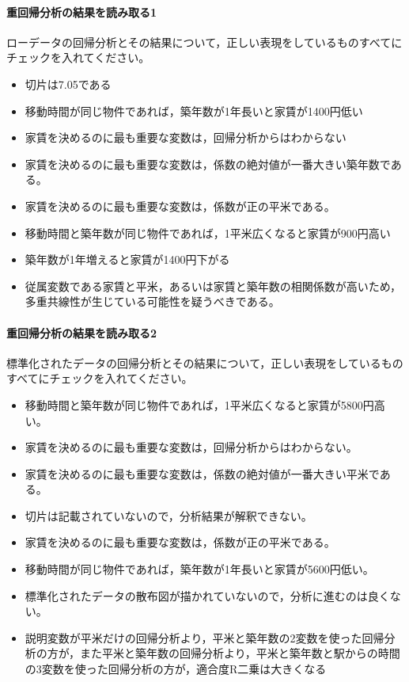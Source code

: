 \documentclass{ltjbook}
\begin{document}
\paragraph{重回帰分析の結果を読み取る1}ローデータの回帰分析とその結果について，正しい表現をしているものすべてにチェックを入れてください。
\begin{itemize}
	\item 切片は7.05である
	\item 移動時間が同じ物件であれば，築年数が1年長いと家賃が1400円低い
	\item 家賃を決めるのに最も重要な変数は，回帰分析からはわからない
	\item 家賃を決めるのに最も重要な変数は，係数の絶対値が一番大きい築年数である。
	\item 家賃を決めるのに最も重要な変数は，係数が正の平米である。
	\item 移動時間と築年数が同じ物件であれば，1平米広くなると家賃が900円高い
	\item 築年数が1年増えると家賃が1400円下がる
	\item 従属変数である家賃と平米，あるいは家賃と築年数の相関係数が高いため，多重共線性が生じている可能性を疑うべきである。
\end{itemize}

\paragraph{重回帰分析の結果を読み取る2}標準化されたデータの回帰分析とその結果について，正しい表現をしているものすべてにチェックを入れてください。
\begin{itemize}
	\item 移動時間と築年数が同じ物件であれば，1平米広くなると家賃が5800円高い。
	\item 家賃を決めるのに最も重要な変数は，回帰分析からはわからない。
	\item 家賃を決めるのに最も重要な変数は，係数の絶対値が一番大きい平米である。
	\item 切片は記載されていないので，分析結果が解釈できない。
	\item 家賃を決めるのに最も重要な変数は，係数が正の平米である。
	\item 移動時間が同じ物件であれば，築年数が1年長いと家賃が5600円低い。
	\item 標準化されたデータの散布図が描かれていないので，分析に進むのは良くない。
	\item 説明変数が平米だけの回帰分析より，平米と築年数の2変数を使った回帰分析の方が，また平米と築年数の回帰分析より，平米と築年数と駅からの時間の3変数を使った回帰分析の方が，適合度R二乗は大きくなる
\end{itemize}
\end{document}
